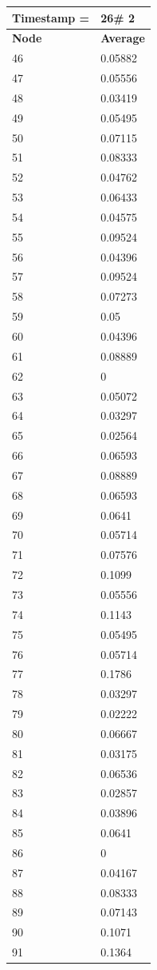 \begin{tabular}{|l||l|}
\hline
\textbf{Timestamp =} & \textbf{26}\# 2\\\hline
	\textbf{Node} & \textbf{Average} \\ \hline
\hline
	46 & 0.05882 \\ \hline
	47 & 0.05556 \\ \hline
	48 & 0.03419 \\ \hline
	49 & 0.05495 \\ \hline
	50 & 0.07115 \\ \hline
	51 & 0.08333 \\ \hline
	52 & 0.04762 \\ \hline
	53 & 0.06433 \\ \hline
	54 & 0.04575 \\ \hline
	55 & 0.09524 \\ \hline
	56 & 0.04396 \\ \hline
	57 & 0.09524 \\ \hline
	58 & 0.07273 \\ \hline
	59 & 0.05 \\ \hline
	60 & 0.04396 \\ \hline
	61 & 0.08889 \\ \hline
	62 & 0 \\ \hline
	63 & 0.05072 \\ \hline
	64 & 0.03297 \\ \hline
	65 & 0.02564 \\ \hline
	66 & 0.06593 \\ \hline
	67 & 0.08889 \\ \hline
	68 & 0.06593 \\ \hline
	69 & 0.0641 \\ \hline
	70 & 0.05714 \\ \hline
	71 & 0.07576 \\ \hline
	72 & 0.1099 \\ \hline
	73 & 0.05556 \\ \hline
	74 & 0.1143 \\ \hline
	75 & 0.05495 \\ \hline
	76 & 0.05714 \\ \hline
	77 & 0.1786 \\ \hline
	78 & 0.03297 \\ \hline
	79 & 0.02222 \\ \hline
	80 & 0.06667 \\ \hline
	81 & 0.03175 \\ \hline
	82 & 0.06536 \\ \hline
	83 & 0.02857 \\ \hline
	84 & 0.03896 \\ \hline
	85 & 0.0641 \\ \hline
	86 & 0 \\ \hline
	87 & 0.04167 \\ \hline
	88 & 0.08333 \\ \hline
	89 & 0.07143 \\ \hline
	90 & 0.1071 \\ \hline
	91 & 0.1364 \\ \hline
\end{tabular}
